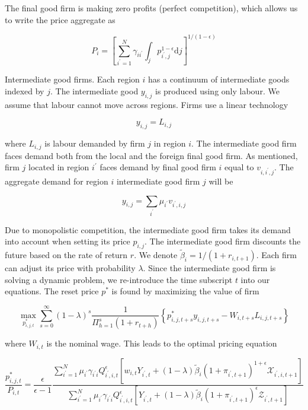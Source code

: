 \documentclass[\latexroot/\projectname]{subfiles}
\begin{document}
The final good firm is making zero profits (perfect competition), which allows us to write the price aggregate as


\begin{equation*}
P_{i}=\left[\sum_{i^{\prime}=1}^{N} \gamma_{i i^{\prime}} \int_{j} p_{i^{\prime}, j}^{1-\epsilon} \mathrm{d} j\right]^{1 /(1-\epsilon)} \tag{4.13}
\end{equation*}


Intermediate good firms. Each region $i$ has a continuum of intermediate goods indexed by $j$. The intermediate good $y_{i, j}$ is produced using only labour. We assume that labour cannot move across regions. Firms use a linear technology


\begin{equation*}
y_{i, j}=L_{i, j} \tag{4.14}
\end{equation*}


where $L_{i, j}$ is labour demanded by firm $j$ in region $i$. The intermediate good firm faces demand both from the local and the foreign final good firm. As mentioned, firm $j$ located in region $i^{\prime}$ faces demand by final good firm $i$ equal to $v_{i, i^{\prime}, j}$. The aggregate demand for region $i$ intermediate good firm $j$ will be


\begin{equation*}
y_{i, j}=\sum_{i^{\prime}} \mu_{i^{\prime}} v_{i^{\prime}, i, j} \tag{4.15}
\end{equation*}


Due to monopolistic competition, the intermediate good firm takes its demand into account when setting its price $p_{i, j}$. The intermediate good firm discounts the future based on the rate of return $r$. We denote $\tilde{\beta}_{i}=1 /\left(1+r_{i, t+1}\right)$. Each firm can adjust its price with probability $\lambda$. Since the intermediate good firm is solving a dynamic problem, we re-introduce the time subscript $t$ into our equations. The reset price $p^{*}$ is found by maximizing the value of firm


\begin{equation*}
\max _{p_{i, j, t}^{*}} \sum_{s=0}^{\infty}(1-\lambda)^{s} \frac{1}{\Pi_{h=1}^{s}\left(1+r_{t+h}\right)}\left\{p_{i, j, t+s}^{*} y_{i, j, t+s}-W_{i, t+s} L_{i, j, t+s}\right\} \tag{4.16}
\end{equation*}


where $W_{i, t}$ is the nominal wage. This leads to the optimal pricing equation


\begin{equation*}
\frac{p_{i, j, t}^{*}}{P_{i, t}}=\frac{\epsilon}{\epsilon-1} \frac{\sum_{i^{\prime}=1}^{N} \mu_{i^{\prime}} \gamma_{i^{\prime} i} Q_{i^{\prime}, i, t}^{\epsilon}\left[w_{i, t} Y_{i^{\prime}, t}+(1-\lambda) \tilde{\beta}_{i}\left(1+\pi_{i^{\prime}, t+1}\right)^{1+\epsilon} \mathcal{X}_{i^{\prime}, i, t+1}\right]}{\sum_{i^{\prime}=1}^{N} \mu_{i^{\prime}} \gamma_{i^{\prime} i} Q_{i^{\prime}, i, t}^{\epsilon}\left[Y_{i^{\prime}, t}+(1-\lambda) \tilde{\beta}_{i}\left(1+\pi_{i^{\prime}, t+1}\right)^{\epsilon} \mathcal{Z}_{i^{\prime}, t+1}\right]} \tag{4.17}
\end{equation*}
\end{document}
